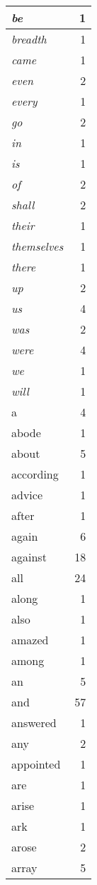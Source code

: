 \begin{center}
\begin{longtable}{l|r}
\emph{be} & 1 \\ \hline
\emph{breadth} & 1 \\ \hline
\emph{came} & 1 \\ \hline
\emph{even} & 2 \\ \hline
\emph{every} & 1 \\ \hline
\emph{go} & 2 \\ \hline
\emph{in} & 1 \\ \hline
\emph{is} & 1 \\ \hline
\emph{of} & 2 \\ \hline
\emph{shall} & 2 \\ \hline
\emph{their} & 1 \\ \hline
\emph{themselves} & 1 \\ \hline
\emph{there} & 1 \\ \hline
\emph{up} & 2 \\ \hline
\emph{us} & 4 \\ \hline
\emph{was} & 2 \\ \hline
\emph{were} & 4 \\ \hline
\emph{we} & 1 \\ \hline
\emph{will} & 1 \\ \hline
a & 4 \\ \hline
abode & 1 \\ \hline
about & 5 \\ \hline
according & 1 \\ \hline
advice & 1 \\ \hline
after & 1 \\ \hline
again & 6 \\ \hline
against & 18 \\ \hline
all & 24 \\ \hline
along & 1 \\ \hline
also & 1 \\ \hline
amazed & 1 \\ \hline
among & 1 \\ \hline
an & 5 \\ \hline
and & 57 \\ \hline
answered & 1 \\ \hline
any & 2 \\ \hline
appointed & 1 \\ \hline
are & 1 \\ \hline
arise & 1 \\ \hline
ark & 1 \\ \hline
arose & 2 \\ \hline
array & 5 \\ \hline

\end{longtable}
\end{center}
